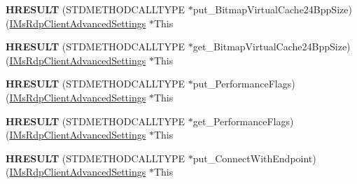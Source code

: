 \begin{DoxyCompactItemize}
\item 
\mbox{\label{struct_m_s_t_s_c_lib_1_1_i_ms_rdp_client_advanced_settings_vtbl_a06d136fde84b0a8319bea3afbdf0b7a5}} 
{\bfseries H\+R\+E\+S\+U\+LT} (S\+T\+D\+M\+E\+T\+H\+O\+D\+C\+A\+L\+L\+T\+Y\+PE $\ast$put\+\_\+\+Bitmap\+Virtual\+Cache24\+Bpp\+Size)(\hyperlink{interface_m_s_t_s_c_lib_1_1_i_ms_rdp_client_advanced_settings}{I\+Ms\+Rdp\+Client\+Advanced\+Settings} $\ast$This
\item 
\mbox{\label{struct_m_s_t_s_c_lib_1_1_i_ms_rdp_client_advanced_settings_vtbl_a19ca3a3d3674c5cbb0acec3d75f99520}} 
{\bfseries H\+R\+E\+S\+U\+LT} (S\+T\+D\+M\+E\+T\+H\+O\+D\+C\+A\+L\+L\+T\+Y\+PE $\ast$get\+\_\+\+Bitmap\+Virtual\+Cache24\+Bpp\+Size)(\hyperlink{interface_m_s_t_s_c_lib_1_1_i_ms_rdp_client_advanced_settings}{I\+Ms\+Rdp\+Client\+Advanced\+Settings} $\ast$This
\item 
\mbox{\label{struct_m_s_t_s_c_lib_1_1_i_ms_rdp_client_advanced_settings_vtbl_a1ba23a67a1bd357778e155b5d2ae1498}} 
{\bfseries H\+R\+E\+S\+U\+LT} (S\+T\+D\+M\+E\+T\+H\+O\+D\+C\+A\+L\+L\+T\+Y\+PE $\ast$put\+\_\+\+Performance\+Flags)(\hyperlink{interface_m_s_t_s_c_lib_1_1_i_ms_rdp_client_advanced_settings}{I\+Ms\+Rdp\+Client\+Advanced\+Settings} $\ast$This
\item 
\mbox{\label{struct_m_s_t_s_c_lib_1_1_i_ms_rdp_client_advanced_settings_vtbl_a83e7acf616416687ae48595346f94fce}} 
{\bfseries H\+R\+E\+S\+U\+LT} (S\+T\+D\+M\+E\+T\+H\+O\+D\+C\+A\+L\+L\+T\+Y\+PE $\ast$get\+\_\+\+Performance\+Flags)(\hyperlink{interface_m_s_t_s_c_lib_1_1_i_ms_rdp_client_advanced_settings}{I\+Ms\+Rdp\+Client\+Advanced\+Settings} $\ast$This
\item 
\mbox{\label{struct_m_s_t_s_c_lib_1_1_i_ms_rdp_client_advanced_settings_vtbl_a1f14922a036f9f823d6ae8c9c9a6d8ef}} 
{\bfseries H\+R\+E\+S\+U\+LT} (S\+T\+D\+M\+E\+T\+H\+O\+D\+C\+A\+L\+L\+T\+Y\+PE $\ast$put\+\_\+\+Connect\+With\+Endpoint)(\hyperlink{interface_m_s_t_s_c_lib_1_1_i_ms_rdp_client_advanced_settings}{I\+Ms\+Rdp\+Client\+Advanced\+Settings} $\ast$This

\end{DoxyCompactItemize}
